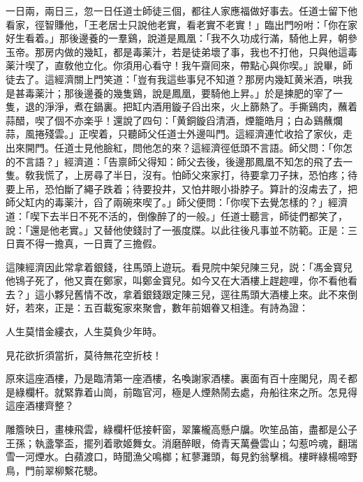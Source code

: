 一日兩，兩日三，忽一日任道士師徒三個，都往人家應福做好事去。任道士留下他看家，徑智賺他，「王老居士只說他老實，看老實不老實！」臨出門吩咐：「你在家好生看着。」那後邊養的一羣鷄，說道是鳳凰：「我不久功成行滿，騎他上昇，朝參玉帝。那房内做的幾缸，都是毒薬汁，若是徒弟壞了事，我也不打他，只與他這毒薬汁喫了，直敎他立化。你須用心看守！我午齋囘來，帶點心與你喫。」說畢，師徒去了。這經濟關上門笑道：「豈有我這些事兒不知道？那房内幾缸黄米酒，哄我是甚毒薬汁；那後邊養的幾隻鷄，說是鳳凰，要騎他上昇。」於是揀肥的宰了一隻，退的淨淨，煮在鍋裏。把缸内酒用鏇子舀出來，火上篩熱了。手撕鷄肉，蘸着蒜醋，喫了個不亦楽乎！還說了四句：「黄銅鏇舀清酒，煙籠皓月；白ゐ鷄蘸爛蒜，風捲殘雲。」正喫着，只聽師父任道士外邊叫門。這經濟連忙收拾了家伙，走出來開門。任道士見他臉紅，問他怎的來？這經濟徑低頭不言語。師父問：「你怎的不言語？」經濟道：「告禀師父得知：師父去後，後邊那鳳凰不知怎的飛了去一隻。敎我慌了，上房尋了半日，沒有。怕師父來家打，待要拿刀子抹，恐怕疼；待要上吊，恐怕斷了繩子跌着；待要投井，又怕井眼小掛脖子。算計的沒䖏去了，把師父缸内的毒薬汁，舀了兩碗來喫了。」師父便問：「你喫下去覺怎樣的？」經濟道：「喫下去半日不死不活的，倒像醉了的一般。」任道士聽言，師徒們都笑了，說：「還是他老實。」又替他使錢討了一張度牒。以此往後凡事並不防範。正是：三日賣不得一擔真，一日賣了三擔假。

這陳經濟因此常拿着銀錢，往馬頭上遊玩。看見院中架兒陳三兒，説：「馮金寳兒他鴇子死了，他又賣在鄭家，叫鄭金寳兒。如今又在大酒樓上趕趂哩，你不看他看去？」這小夥兒舊情不改，拿着銀錢跟定陳三兒，逕往馬頭大酒樓上來。此不來倒好，若來，正是：五百載寃家來聚會，數年前姻眷又相逢。有詩為證：

\begin{myquote}
人生莫惜金縷衣，人生莫負少年時。

見花欲折須當折，莫待無花空折枝！
\end{myquote}

原來這座酒樓，乃是臨清第一座酒樓，名喚謝家酒樓。裏面有百十座閣兒，周そ都是綠欄杆。就緊靠着山崗，前臨官河，極是人煙熱鬧去處，舟船往來之所。怎見得這座酒樓齊整？

\begin{myquote}
雕簷映日，畫棟飛雲，綠欄杆低接軒窗，翠簾櫳高懸户牖。吹笙品笛，盡都是公子王孫；執盞擎盃，擺列着歌姬舞女。消磨醉眼，倚青天萬疊雲山；勾惹吟魂，翻瑞雪一河煙水。白蘋渡口，時聞漁父鳴榔；紅蓼灘頭，每見釣翁擊楫。樓畔綠楊啼野鳥，門前翠柳繫花驄。
\end{myquote}

